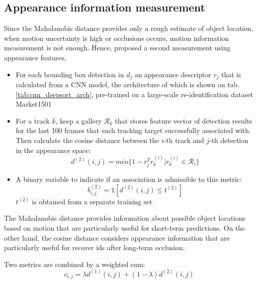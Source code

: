 \subsection{Appearance information measurement}
\hspace{0.5cm} Since the Mahalanobis distance provides only a rough estimate of object location, when motion uncertainty is high or occlusions occurs, motion information measurement is not enough. Hence, \cite{Wojke2017simple} proposed a second measurement using appearance features.\par
\begin{itemize}
    \item For each bounding box detection in $d_j$ an appearance descriptor $r_j$ that is calculated from a  \acrshort{CNN} model, 
    the architecture of which is shown on tab.\ref{tab:cnn_deepsort_arch}, pre-trained on a large-scale re-identification dataset Market1501
    
    \item For a track $k$, keep a gallery $\mathcal{R}_k$ that stores feature vector of detection results for the last 100 frames that each tracking target successfully associated with.
     Then calculate the cosine distance between the $i$-th track and $j$-th detection in the appearance space:
    \begin{equation}
        d^{(2)}(i,j) = min\{1 - r_j^Tr^{(i)}_k | r^{(i)}_k\in \mathcal{R}_i\}
    \end{equation}
    \item A binary variable to indicate if an association is admissible to this metric:
    \begin{equation}
        b^{(2)}_{i,j}=\mathbb{1}[d^{(2)}(i,j) \leq t^{(2)}]
    \end{equation}
    $t^{(2)}$ is obtained from a separate training set
\end{itemize}
\hspace{0.5cm}The Mahalanobis distance provides information about possible object locations based on motion that are particularly useful for short-term predictions. On the other hand, the cosine distance considers appearance information that are particularly useful for recover ids after long-term occlusion.\par
Two metrics are combined by a weighted sum:
\begin{equation}
    c_{i,j} = \lambda d^{(1)}(i,j) + (1-\lambda)d^{(2)}(i,j)
\end{equation}

